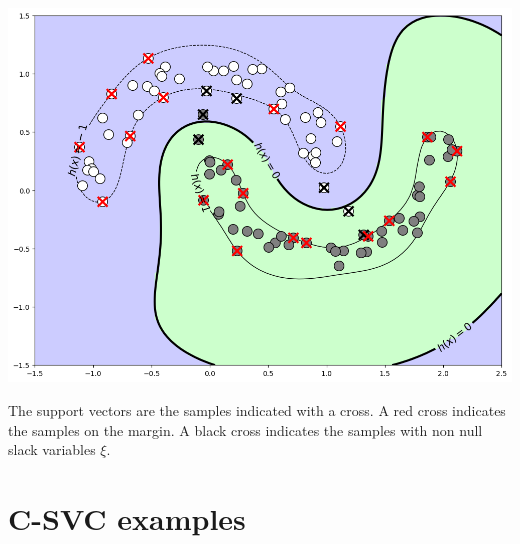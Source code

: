 \documentclass{article}
\begin{document}
\begin{multicols*}{3}
				\includegraphics[width=\columnwidth]{csvc001.png}

				The support vectors are the samples indicated with a cross. A red cross indicates the samples on the margin. A black cross indicates the samples with non null slack variables $\xi$.
			
			\section*{C-SVC examples}


		\end{multicols*}
		
\end{document}
